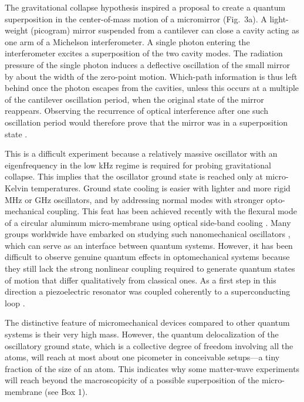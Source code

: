 \documentclass[11pt]{article}
\begin{document}
The  gravitational collapse hypothesis \cite{Penrose1996} inspired a proposal to create a quantum superposition in the center-of-mass motion of a micromirror \cite{Marshall2003} (Fig.~3a). A light-weight (picogram) mirror suspended from a cantilever can close a cavity acting as one arm of a Michelson interferometer.
A single photon entering the interferometer excites a superposition of the two cavity modes. 
The  radiation pressure of the single photon induces a deflective oscillation of the small mirror by about the width of the zero-point motion.
Which-path information is thus left behind once the photon escapes from the cavities, unless this occurs at a multiple of the cantilever oscillation period, when the original state of the mirror reappears.
Observing the recurrence of optical interference after one such oscillation period  would therefore prove that the mirror was in a superposition state \cite{Marshall2003,Bose1999a}.

This is a difficult experiment because a relatively massive oscillator with an eigenfrequency in the low kHz regime is required
for probing gravitational collapse.  
This implies that the oscillator ground state is reached only at micro-Kelvin temperatures. Ground state cooling is easier with lighter and more rigid MHz or GHz oscillators, and by addressing normal modes with stronger opto-mechanical coupling. This feat has been achieved recently with the flexural mode
of a circular aluminum micro-membrane using optical side-band cooling \cite{Teufel2011_long,Chan2011}.
Many groups worldwide have embarked on studying
such nanomechanical oscillators \cite{aspelmeyer2013cavity},
which can serve as an interface between quantum systems. However, it has been difficult to observe genuine quantum effects in optomechanical systems because they still lack the strong nonlinear coupling  required to generate quantum states of motion that differ qualitatively from classical ones. As a first step in this direction a piezoelectric resonator was coupled coherently to a superconducting loop \cite{OConnell2010_long}.



The distinctive feature of micromechanical devices compared to other quantum systems is their very high mass. However, the quantum delocalization of the oscillatory ground state,
which is a collective degree of freedom involving all the atoms,
will reach at most about one picometer in conceivable setups---a tiny fraction of the size of an atom.
This indicates why some matter-wave experiments will reach beyond the macroscopicity  of a possible superposition of the micro-membrane (see Box 1).
\end{document}
